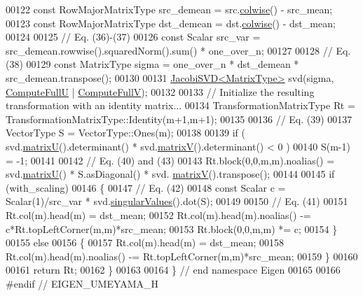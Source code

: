 \begin{DoxyCode}
00122   \textcolor{keyword}{const} RowMajorMatrixType src\_demean = src.\hyperlink{group___core___module_a978724c07b70cb9b8fdef67a4de08788}{colwise}() - src\_mean;
00123   \textcolor{keyword}{const} RowMajorMatrixType dst\_demean = dst.\hyperlink{group___core___module_a978724c07b70cb9b8fdef67a4de08788}{colwise}() - dst\_mean;
00124 
00125   \textcolor{comment}{// Eq. (36)-(37)}
00126   \textcolor{keyword}{const} Scalar src\_var = src\_demean.rowwise().squaredNorm().sum() * one\_over\_n;
00127 
00128   \textcolor{comment}{// Eq. (38)}
00129   \textcolor{keyword}{const} MatrixType sigma = one\_over\_n * dst\_demean * src\_demean.transpose();
00130 
00131   \hyperlink{group___s_v_d___module_class_eigen_1_1_jacobi_s_v_d}{JacobiSVD<MatrixType>} svd(sigma, \hyperlink{group__enums_ggae3e239fb70022eb8747994cf5d68b4a9a2b4f91ca5859a4159dbfe8090043817f}{ComputeFullU} | 
      \hyperlink{group__enums_ggae3e239fb70022eb8747994cf5d68b4a9a52c6f7e80bbf9a42297c88f700245b51}{ComputeFullV});
00132 
00133   \textcolor{comment}{// Initialize the resulting transformation with an identity matrix...}
00134   TransformationMatrixType Rt = TransformationMatrixType::Identity(m+1,m+1);
00135 
00136   \textcolor{comment}{// Eq. (39)}
00137   VectorType S = VectorType::Ones(m);
00138 
00139   \textcolor{keywordflow}{if}  ( svd.\hyperlink{group___s_v_d___module_afc7fe1546b0f6e1801b86f22f5664cb8}{matrixU}().determinant() * svd.\hyperlink{group___s_v_d___module_a245a453b5e7347f737295c23133238c4}{matrixV}().determinant() < 0 )
00140     S(m-1) = -1;
00141 
00142   \textcolor{comment}{// Eq. (40) and (43)}
00143   Rt.block(0,0,m,m).noalias() = svd.\hyperlink{group___s_v_d___module_afc7fe1546b0f6e1801b86f22f5664cb8}{matrixU}() * S.asDiagonal() * svd.
      \hyperlink{group___s_v_d___module_a245a453b5e7347f737295c23133238c4}{matrixV}().transpose();
00144 
00145   \textcolor{keywordflow}{if} (with\_scaling)
00146   \{
00147     \textcolor{comment}{// Eq. (42)}
00148     \textcolor{keyword}{const} Scalar c = Scalar(1)/src\_var * svd.\hyperlink{group___s_v_d___module_a4e7bac123570c348f7ed6be909e1e474}{singularValues}().dot(S);
00149 
00150     \textcolor{comment}{// Eq. (41)}
00151     Rt.col(m).head(m) = dst\_mean;
00152     Rt.col(m).head(m).noalias() -= c*Rt.topLeftCorner(m,m)*src\_mean;
00153     Rt.block(0,0,m,m) *= c;
00154   \}
00155   \textcolor{keywordflow}{else}
00156   \{
00157     Rt.col(m).head(m) = dst\_mean;
00158     Rt.col(m).head(m).noalias() -= Rt.topLeftCorner(m,m)*src\_mean;
00159   \}
00160 
00161   \textcolor{keywordflow}{return} Rt;
00162 \}
00163 
00164 \} \textcolor{comment}{// end namespace Eigen}
00165 
00166 \textcolor{preprocessor}{#endif // EIGEN\_UMEYAMA\_H}
\end{DoxyCode}
